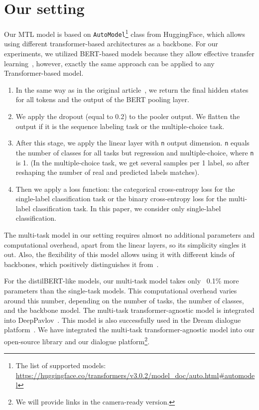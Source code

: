 \section{Our setting}


Our MTL model is based on \texttt{AutoModel}\footnote{The list of supported models: \url{https://huggingface.co/transformers/v3.0.2/model_doc/auto.html\#automodel}} class from HuggingFace, which allows using different transformer-based architectures as a backbone. For our experiments, we utilized BERT-based models because they allow effective transfer learning~\cite{10.1007/978-3-031-19032-2_46, ksquad}, however, exactly the same approach can be applied to any Transformer-based model.

\begin{enumerate}

    \item In the same way as in the original article~\cite{bert}, we return the final hidden states for all tokens and the output of the BERT pooling layer.

    \item We apply the dropout (equal to 0.2) to the pooler output. We flatten the output if it is the sequence labeling task or the multiple-choice task.

    \item After this stage, we apply the linear layer with \texttt{n} output dimension. \texttt{n} equals the number of classes for all tasks but regression and multiple-choice, where \texttt{n} is 1. (In the multiple-choice task, we get several samples per 1 label, so after reshaping the number of real and predicted labels matches). 

    \item Then we apply a loss function: the categorical cross-entropy loss for the single-label classification task or the binary cross-entropy loss for the multi-label classification task. In this paper, we consider only single-label classification.

\end{enumerate}

The multi-task model in our setting requires almost no additional parameters and computational overhead, apart from the linear layers, so its simplicity singles it out. Also, the flexibility of this model allows using it with different kinds of backbones, which positively distinguishes it from~\cite{PAL:19}.

For the distilBERT-like models, our multi-task model takes only ~0.1\% more parameters than the single-task models. This computational overhead varies around this number, depending on the number of tasks, the number of classes, and the backbone model. 
\ifinterspeechfinal
The multi-task transformer-agnostic model is integrated into DeepPavlov~\cite{Burtsev2018DeepPavlovAO}. This model is also successfully used in the Dream dialogue platform~\cite{baymurzina2021dream}. 
\else
We have integrated the multi-task transformer-agnostic model into our open-source library and our dialogue platform\footnote{We will provide links in the camera-ready version.}.
\fi

